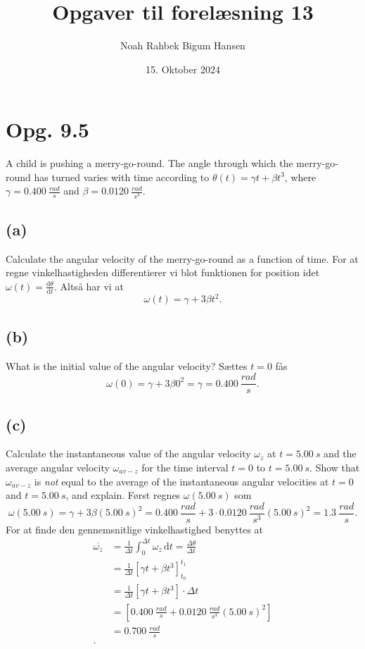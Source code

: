 \documentclass[12pt]{article}
\title{Opgaver til forelæsning 13}
\author{Noah Rahbek Bigum Hansen}
\date{15. Oktober 2024}
\begin{document}
\maketitle

\section*{Opg. 9.5}
A child is pushing a merry-go-round. The angle through which the merry-go-round has turned varies with time according to $\theta (t) = \gamma t + \beta t^3$, where $\gamma = \qty{0,400}{\frac{rad}{s}}$ and $\beta = \qty{0,0120}{\frac{rad}{s^3}}$.

\subsection*{(a)}
Calculate the angular velocity of the merry-go-round as a function of time.
\bigbreak
For at regne vinkelhastigheden differentierer vi blot funktionen for position idet $ \omega(t) = \frac{\mathrm{d}\theta}{\mathrm{d}t}$. Altså har vi at
\[
\omega (t) = \gamma + 3\beta t^2 
.\] 

\subsection*{(b)}
What is the initial value of the angular velocity?
\bigbreak
Sættes $t = 0$ fås
 \[
\omega (0) = \gamma + 3\beta 0^2 = \gamma = \qty{0,400}{\frac{rad}{s}}
.\] 


\subsection*{(c)}
Calculate the instantaneous value of the angular velocity $\omega_z$ at $t = \qty{5,00}{s}$ and the average angular velocity $\omega_{av-z}$ for the time interval $t = \num{0}$ to $t = \qty{5,00}{s}$. Show that $\omega_{av-z}$ is \textit{not} equal to the average of the instantaneous angular velocities at $t = \num{0}$ and $t = \qty{5,00}{s}$, and explain.
\bigbreak
Først regnes $\omega (\qty{5,00}{s})$ som
\[
\omega (\qty{5,00}{s}) = \gamma + 3\beta \left( \qty{5,00}{s} \right) ^2 = \qty{0,400}{\frac{rad}{s}} + 3\cdot \qty{0,0120}{\frac{rad}{s^3}} \left( \qty{5,00}{s} \right)^2 = \qty{1,3}{\frac{rad}{s}}
.\]
For at finde den gennemsnitlige vinkelhastighed benyttes at
\begin{align*}
  \overline{\omega_z} &= \frac{1}{\Delta t} \int_0^{\Delta t} \omega_z \, \mathrm{d}t = \frac{\Delta \theta}{\Delta t} \\
  &= \frac{1}{\Delta t} \left[ \gamma t + \beta t^3 \right]_{t_0}^{t_1} \\
  &= \frac{1}{\Delta t} \left[ \gamma t + \beta t^3 \right]\cdot \Delta t\\
  &= \left[ \qty{0,400}{\frac{rad}{s}} + \qty{0,0120}{\frac{rad}{s^3}} \left( \qty{5,00}{s} \right) ^2 \right]  \\
  &= \qty{0,700}{\frac{rad}{s}} \\
.\end{align*}
\end{document}
